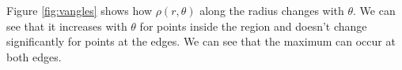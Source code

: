 Figure \ref{fig:vangles} shows how $\rho(r,\theta)$ along the radius changes with $\theta$. We can see that it increases with $\theta$ for points inside the region and doesn't change significantly for points at the edges. We can see that the maximum can occur at both edges.

